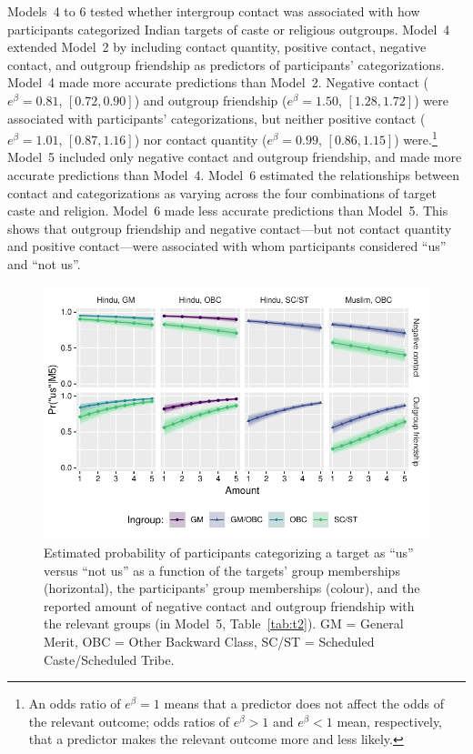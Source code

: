 \documentclass[12pt, a4paper]{article}
\begin{document}
Models~4 to 6 tested whether intergroup contact was associated with how participants categorized Indian targets of caste or religious outgroups. Model~4 extended Model~2 by including contact quantity, positive contact, negative contact, and outgroup friendship as predictors of participants’ categorizations. Model~4 made more accurate predictions than Model~2. Negative contact ($e^\beta = 0.81$, $[0.72, 0.90]$) and outgroup friendship ($e^\beta = 1.50$, $[1.28, 1.72]$) were associated with participants' categorizations, but neither positive contact ($e^\beta = 1.01$, $[0.87, 1.16]$) nor contact quantity ($e^\beta = 0.99$, $[0.86, 1.15]$) were.\footnote{An odds ratio of $e^\beta = 1$ means that a predictor does not affect the odds of the relevant outcome; odds ratios of $e^\beta > 1$ and $e^\beta < 1$ mean, respectively, that a predictor makes the relevant outcome more and less likely.} Model~5 included only negative contact and outgroup friendship, and made more accurate predictions than Model~4. Model~6 estimated the relationships between contact and categorizations as varying across the four combinations of target caste and religion. Model~6 made less accurate predictions than Model~5. This shows that outgroup friendship and negative contact---but not contact quantity and positive contact---were associated with whom participants considered ``us'' and ``not us''.

\begin{figure}[t!]
\centering
\includegraphics[scale=1]{../figures/figure-4}
\caption{Estimated probability of participants categorizing a target as ``us'' versus ``not us'' as a function of the targets' group memberships (horizontal), the participants' group memberships (colour), and the reported amount of negative contact and outgroup friendship with the relevant groups (in Model~5, Table~\ref{tab:t2}). GM = General Merit, OBC = Other Backward Class, SC/ST = Scheduled Caste/Scheduled Tribe.}
\label{fig:f4}
\end{figure}
\end{document}
